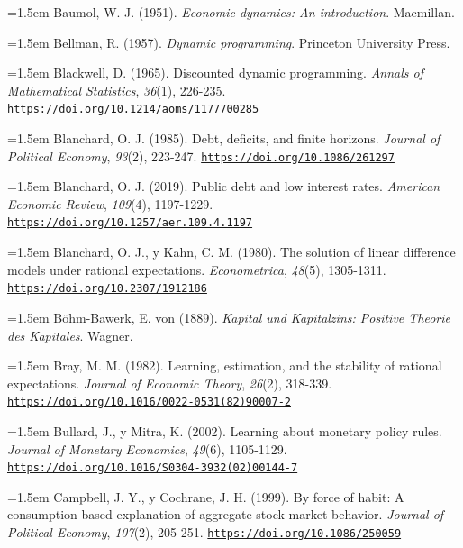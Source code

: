 \documentclass[10pt,a4paper]{article}
\begin{document}
\noindent\hangindent=1.5em Baumol, W. J. (1951). \textit{Economic dynamics: An introduction}. Macmillan.

\noindent\hangindent=1.5em Bellman, R. (1957). \textit{Dynamic programming}. Princeton University Press.

\noindent\hangindent=1.5em Blackwell, D. (1965). Discounted dynamic programming. \textit{Annals of Mathematical Statistics}, \textit{36}(1), 226-235. \href{https://doi.org/10.1214/aoms/1177700285}{\nolinkurl{https://doi.org/10.1214/aoms/1177700285}}

\noindent\hangindent=1.5em Blanchard, O. J. (1985). Debt, deficits, and finite horizons. \textit{Journal of Political Economy}, \textit{93}(2), 223-247. \href{https://doi.org/10.1086/261297}{\nolinkurl{https://doi.org/10.1086/261297}}

\noindent\hangindent=1.5em Blanchard, O. J. (2019). Public debt and low interest rates. \textit{American Economic Review}, \textit{109}(4), 1197-1229. \href{https://doi.org/10.1257/aer.109.4.1197}{\nolinkurl{https://doi.org/10.1257/aer.109.4.1197}}

\noindent\hangindent=1.5em Blanchard, O. J., y Kahn, C. M. (1980). The solution of linear difference models under rational expectations. \textit{Econometrica}, \textit{48}(5), 1305-1311. \href{https://doi.org/10.2307/1912186}{\nolinkurl{https://doi.org/10.2307/1912186}}

\noindent\hangindent=1.5em Böhm-Bawerk, E. von (1889). \textit{Kapital und Kapitalzins: Positive Theorie des Kapitales}. Wagner.

\noindent\hangindent=1.5em Bray, M. M. (1982). Learning, estimation, and the stability of rational expectations. \textit{Journal of Economic Theory}, \textit{26}(2), 318-339. \href{https://doi.org/10.1016/0022-0531(82)90007-2}{\nolinkurl{https://doi.org/10.1016/0022-0531(82)90007-2}}

\noindent\hangindent=1.5em Bullard, J., y Mitra, K. (2002). Learning about monetary policy rules. \textit{Journal of Monetary Economics}, \textit{49}(6), 1105-1129. \href{https://doi.org/10.1016/S0304-3932(02)00144-7}{\nolinkurl{https://doi.org/10.1016/S0304-3932(02)00144-7}}

\noindent\hangindent=1.5em Campbell, J. Y., y Cochrane, J. H. (1999). By force of habit: A consumption-based explanation of aggregate stock market behavior. \textit{Journal of Political Economy}, \textit{107}(2), 205-251. \href{https://doi.org/10.1086/250059}{\nolinkurl{https://doi.org/10.1086/250059}}
\end{document}
